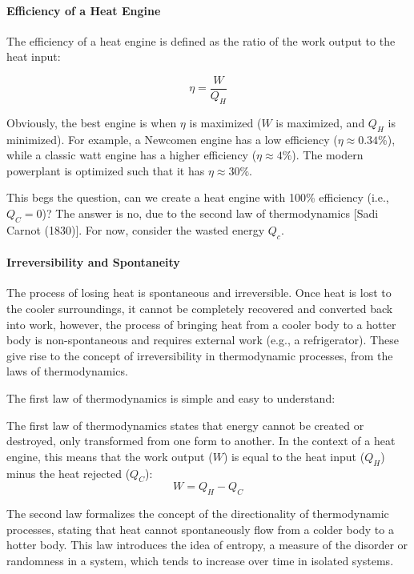 \documentclass[11pt]{report}
\begin{document}
\paragraph{Efficiency of a Heat Engine} The efficiency of a heat engine is defined as the ratio of the work output to the heat input:

\begin{equation}
    \eta = \frac{W}{Q_H}
\end{equation}

Obviously, the best engine is when $\eta$ is maximized ($W$ is maximized, and $Q_H$ is minimized). For example, a Newcomen engine has a low efficiency ($\eta \approx 0.34\%$), while a classic watt engine has a higher efficiency ($\eta \approx 4\%$). The modern powerplant is optimized such that it has $\eta \approx 30\%$.

This begs the question, can we create a heat engine with 100\% efficiency (i.e., $Q_C = 0$)? The answer is no, due to the second law of thermodynamics [Sadi Carnot (1830)]. For now, consider the wasted energy $Q_c$. 

\paragraph{Irreversibility and Spontaneity} The process of losing heat is spontaneous and irreversible. Once heat is lost to the cooler surroundings, it cannot be completely recovered and converted back into work, however, the process of bringing heat from a cooler body to a hotter body is non-spontaneous and requires external work (e.g., a refrigerator). These give rise to the concept of irreversibility in thermodynamic processes, from the laws of thermodynamics.

The first law of thermodynamics is simple and easy to understand:
\begin{definition} \label{def:firstlaw}
    The first law of thermodynamics states that energy cannot be created or destroyed, only transformed from one form to another. In the context of a heat engine, this means that the work output ($W$) is equal to the heat input ($Q_H$) minus the heat rejected ($Q_C$):
    \begin{equation}
        W = Q_H - Q_C
    \end{equation}
\end{definition}
The second law formalizes the concept of the directionality of thermodynamic processes, stating that heat cannot spontaneously flow from a colder body to a hotter body. This law introduces the idea of entropy, a measure of the disorder or randomness in a system, which tends to increase over time in isolated systems.
\end{document}
